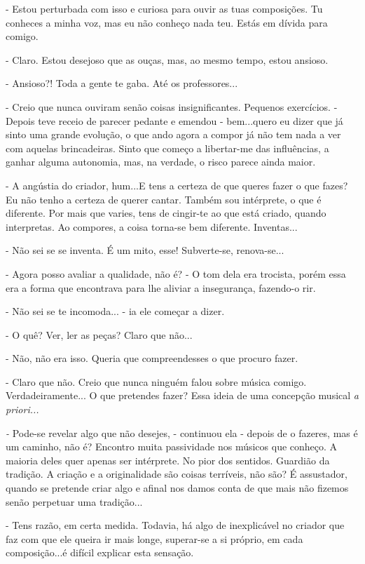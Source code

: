 - Estou perturbada com isso e curiosa para ouvir as tuas composições. Tu
conheces a minha voz, mas eu não conheço nada teu. Estás em dívida para
comigo.

- Claro. Estou desejoso que as ouças, mas, ao mesmo tempo, estou
ansioso.

- Ansioso?! Toda a gente te gaba. Até os professores...

- Creio que nunca ouviram senão coisas insignificantes. Pequenos
exercícios. - Depois teve receio de parecer pedante e emendou -
bem...quero eu dizer que já sinto uma grande evolução, o que ando agora
a compor já não tem nada a ver com aquelas brincadeiras. Sinto que
começo a libertar-me das influências, a ganhar alguma autonomia, mas, na
verdade, o risco parece ainda maior.

- A angústia do criador, hum...E tens a certeza de que queres fazer o
que fazes? Eu não tenho a certeza de querer cantar. Também sou
intérprete, o que é diferente. Por mais que varies, tens de cingir-te ao
que está criado, quando interpretas. Ao compores, a coisa torna-se bem
diferente. Inventas...

- Não sei se se inventa. É um mito, esse! Subverte-se, renova-se...

- Agora posso avaliar a qualidade, não é? - O tom dela era trocista,
porém essa era a forma que encontrava para lhe aliviar a insegurança,
fazendo-o rir.

- Não sei se te incomoda... - ia ele começar a dizer.

- O quê? Ver, ler as peças? Claro que não...

- Não, não era isso. Queria que compreendesses o que procuro fazer.

- Claro que não. Creio que nunca ninguém falou sobre música comigo.
Verdadeiramente... O que pretendes fazer? Essa ideia de uma concepção
musical \emph{a priori...}

\emph{- }Pode-se revelar algo que não desejes, - continuou ela - depois
de o fazeres, mas é um caminho, não é? Encontro muita passividade nos
músicos que conheço. A maioria deles quer apenas ser intérprete. No pior
dos sentidos. Guardião da tradição. A criação e a originalidade são
coisas terríveis, não são? É assustador, quando se pretende criar algo e
afinal nos damos conta de que mais não fizemos senão perpetuar uma
tradição...

- Tens razão, em certa medida. Todavia, há algo de inexplicável no
criador que faz com que ele queira ir mais longe, superar-se a si
próprio, em cada composição...é difícil explicar esta sensação.

